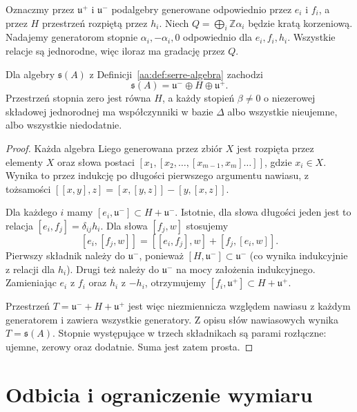 Oznaczmy przez $\mathfrak u^+$ i $\mathfrak u^-$ podalgebry generowane odpowiednio przez $e_i$ i $f_i$, a przez $H$ przestrzeń rozpiętą przez $h_i$. Niech $Q=\bigoplus_i\mathbb Z\alpha_i$ będzie kratą korzeniową. Nadajemy generatorom stopnie $\alpha_i,-\alpha_i,0$ odpowiednio dla $e_i,f_i,h_i$. Wszystkie relacje są jednorodne, więc iloraz ma gradację przez $Q$.

\begin{lemat}
\label{aa:lem:serre-triangular}
Dla algebry $\mathfrak s(A)$ z Definicji~\ref{aa:def:serre-algebra} zachodzi
\[
 \mathfrak s(A)=\mathfrak u^-\oplus H\oplus\mathfrak u^+.
\]
Przestrzeń stopnia zero jest równa $H$, a każdy stopień $\beta\ne0$ o niezerowej składowej jednorodnej ma współczynniki w bazie $\Delta$ albo wszystkie nieujemne, albo wszystkie niedodatnie.
\end{lemat}
\begin{proof}
Każda algebra Liego generowana przez zbiór $X$ jest rozpięta przez elementy $X$ oraz słowa postaci $[x_1,[x_2,\ldots,[x_{m-1},x_m]\ldots]]$, gdzie $x_i\in X$. Wynika to przez indukcję po długości pierwszego argumentu nawiasu, z tożsamości $[[x,y],z]=[x,[y,z]]-[y,[x,z]]$.

Dla każdego $i$ mamy $[e_i,\mathfrak u^-]\subset H+\mathfrak u^-$. Istotnie, dla słowa długości jeden jest to relacja $[e_i,f_j]=\delta_{ij}h_i$. Dla słowa $[f_j,w]$ stosujemy
\[
 [e_i,[f_j,w]]=[[e_i,f_j],w]+[f_j,[e_i,w]].
\]
Pierwszy składnik należy do $\mathfrak u^-$, ponieważ $[H,\mathfrak u^-]\subset\mathfrak u^-$ (co wynika indukcyjnie z relacji dla $h_i$). Drugi też należy do $\mathfrak u^-$ na mocy założenia indukcyjnego. Zamieniając $e_i$ z $f_i$ oraz $h_i$ z $-h_i$, otrzymujemy $[f_i,\mathfrak u^+]\subset H+\mathfrak u^+$.

Przestrzeń $T=\mathfrak u^-+H+\mathfrak u^+$ jest więc niezmiennicza względem nawiasu z każdym generatorem i zawiera wszystkie generatory. Z opisu słów nawiasowych wynika $T=\mathfrak s(A)$. Stopnie występujące w trzech składnikach są parami rozłączne: ujemne, zerowy oraz dodatnie. Suma jest zatem prosta.
\end{proof}

\section{Odbicia i ograniczenie wymiaru}

